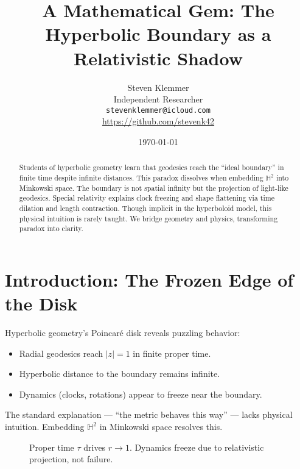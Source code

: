 \documentclass[10pt]{article}
\title{A Mathematical Gem: The Hyperbolic Boundary as a Relativistic Shadow}
\author{Steven Klemmer\\
\small Independent Researcher\\
\small \texttt{stevenklemmer@icloud.com}\\
\small \url{https://github.com/stevenk42}}
\date{\today}
\begin{document}
\maketitle

\begin{abstract}
Students of hyperbolic geometry learn that geodesics reach the ``ideal boundary'' in finite time despite infinite distances. This paradox dissolves when embedding $\mathbb{H}^2$ into Minkowski space. The boundary is not spatial infinity but the projection of light-like geodesics. Special relativity explains clock freezing and shape flattening via time dilation and length contraction. Though implicit in the hyperboloid model, this physical intuition is rarely taught. We bridge geometry and physics, transforming paradox into clarity.
\end{abstract}

\section{Introduction: The Frozen Edge of the Disk}

Hyperbolic geometry's Poincaré disk reveals puzzling behavior:
\begin{itemize}
    \item Radial geodesics reach $|z| = 1$ in finite proper time.
    \item Hyperbolic distance to the boundary remains infinite.
    \item Dynamics (clocks, rotations) appear to freeze near the boundary.
\end{itemize}

The standard explanation --- ``the metric behaves this way'' --- lacks physical intuition. Embedding $\mathbb{H}^2$ in Minkowski space resolves this.

\begin{figure}[H]
\centering
{}
\caption{Proper time $\tau$ drives $r \to 1$. Dynamics freeze due to relativistic projection, not failure.}
\label{fig:radial_flow}
\end{figure}
\hline
\end{document}
